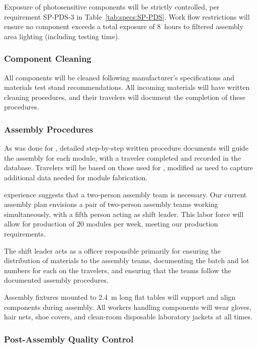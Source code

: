 Exposure of photosensitive components will be strictly controlled, per requirement SP-PDS-3 in Table~\ref{tab:specs:SP-PDS}.  
Work flow restrictions will %
ensure no component exceeds a total exposure of \SI{8}{hours} to filtered assembly area lighting (including testing time).

\subsubsection{Component Cleaning}
\label{sssec:cleaning}
All components will be cleaned 
following manufacturer's specifications and  materials test stand recommendations.  
All incoming materials will have written cleaning procedures, and their travelers will document the completion of these procedures.

\subsubsection{Assembly Procedures}

As was done for , detailed step-by-step written procedure documents will 
guide the assembly for each  module, with a  traveler 
completed and recorded in the database.  Travelers will be based on those used for , modified as need to capture additional data needed for  module fabrication.

 experience suggests that a two-person assembly team is necessary.
Our current assembly plan envisions a pair of two-person assembly teams working simultaneously, with a fifth person acting as shift leader.  This labor force will allow for production of \num{20}  modules per week, meeting our production requirements.  

The shift leader acts as a  officer responsible primarily for ensuring the distribution of materials to the assembly teams, documenting the batch and lot numbers for each  on the travelers, and ensuring that the teams follow the documented assembly procedures.

Assembly fixtures mounted to \SI{2.4}{m} long flat tables will %
support and align  components during assembly.  All workers handling  components will wear gloves, hair nets, shoe covers, and clean-room disposable laboratory jackets at all times.

\subsubsection{Post-Assembly Quality Control}

